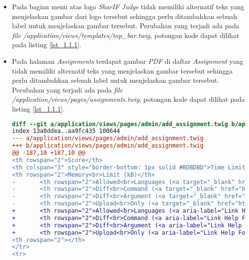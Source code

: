 \begin{itemize}
	\item Pada bagian menu atas logo \textit{SharIF Judge} tidak memiliki alternatif teks yang menjelaskan gambar dari logo tersebut sehingga perlu ditambahkan sebuah label untuk menjelaskan gambar tersebut. Perubahan yang terjadi ada pada \textit{file} \textit{/application/views/templates/top\_bar.twig}, potongan kode dapat dilihat pada listing \ref{lst_1.1.1}.

	\item Pada halaman \textit{Assignments} terdapat gambar \textit{PDF} di daftar \textit{Assignment} yang tidak memiliki alternatif teks yang menjelaskan gambar tersebut sehingga perlu ditambahkan sebuah label untuk menjelaskan gambar tersebut. Perubahan yang terjadi ada pada \textit{file} \textit{/application/views/pages/assignments.twig}, potongan kode dapat dilihat pada listing \ref{lst_1.1.1}.
	
\begin{lstlisting}[language=diff, caption=Perubahan untuk mematuhi kriteria 1.1.1, label=lst_1.1.1, basicstyle=\ttfamily, frame=single,
columns=fullflexible, keepspaces=true, breaklines=true]
diff --git a/application/views/pages/admin/add_assignment.twig b/application/views/pages/admin/add_assignment.twig
index 13a0ddea..aa9fc435 100644
--- a/application/views/pages/admin/add_assignment.twig
+++ b/application/views/pages/admin/add_assignment.twig
@@ -187,10 +187,10 @@
<th rowspan="2">Score</th>
<th colspan="3" style="border-bottom: 1px solid #BDBDBD">Time Limit (ms)</th>
<th rowspan="2">Memory<br>Limit (kB)</th>
- 		<th rowspan="2">Allowed<br>Languages (<a target="_blank" href="https://github.com/ifunpar/Sharif-Judge/blob/docs/v1.4/add_assignment.md#allowed-languages">?</a>)</th>
- 		<th rowspan="2">Diff<br>Command (<a target="_blank" href="https://github.com/ifunpar/Sharif-Judge/blob/docs/v1.4/add_assignment.md#diff-command">?</a>)</th>
- 		<th rowspan="2">Diff<br>Argument (<a target="_blank" href="https://github.com/ifunpar/Sharif-Judge/blob/docs/v1.4/add_assignment.md#diff-arguments">?</a>)</th>
- 		<th rowspan="2">Upload<br>Only (<a target="_blank" href="https://github.com/ifunpar/Sharif-Judge/blob/docs/v1.4/add_assignment.md#upload-only">?</a>)</th>
+ 		<th rowspan="2">Allowed<br>Languages (<a aria-label="Link Help For Languages" target="_blank" href="https://github.com/ifunpar/Sharif-Judge/blob/docs/v1.4/add_assignment.md#allowed-languages">?</a>)</th>
+ 		<th rowspan="2">Diff<br>Command (<a aria-label="Link Help For Diff Command" target="_blank" href="https://github.com/ifunpar/Sharif-Judge/blob/docs/v1.4/add_assignment.md#diff-command">?</a>)</th>
+ 		<th rowspan="2">Diff<br>Argument (<a aria-label="Link Help For Diff Argument" target="_blank" href="https://github.com/ifunpar/Sharif-Judge/blob/docs/v1.4/add_assignment.md#diff-arguments">?</a>)</th>
+ 		<th rowspan="2">Upload<br>Only (<a aria-label="Link Help For Upload Only" target="_blank" href="https://github.com/ifunpar/Sharif-Judge/blob/docs/v1.4/add_assignment.md#upload-only">?</a>)</th>
<th rowspan="2"></th>
</tr>
<tr>


\end{lstlisting}
\end{itemize}
